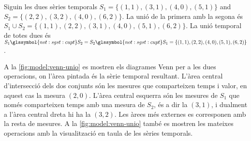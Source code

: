 \begin{example}
  Siguin les dues sèries temporals $S_1=\{(1,1),(3,1),(4,0),(5,1)\}$
  and $S_2=\{(2,2),(3,2),(4,0),(6,2)\}$.  La unió de la primera amb la
  segona és $S_1 \cup S_2 = \{(1,1),(2,2), (3,1),
  (4,0),(5,1),(6,2)\}$. La unió temporal de totes dues és $S_1
  \glssymbol{not:sgst:cupt} S_2 = S_2 \glssymbol{not:sgst:cupt} S_1 =
  \{(1,1),(2,2),(4,0),(5,1),(6,2)\}$. %

  A la \autoref{fig:model:venn-unio} es mostren els diagrames Venn per
  a les dues operacions, on l'àrea pintada és la sèrie temporal
  resultant. L'àrea central d'intersecció dels dos conjunts són les
  mesures que comparteixen temps i valor, en aquest cas la mesura
  $(2,0)$. L'àrea central esquerra són les mesures de $S_1$ que només
  comparteixen temps amb una mesura de $S_2$, és a dir la $(3,1)$, i
  dualment a l'àrea central dreta hi ha la $(3,2)$. Les àrees més
  externes es corresponen amb la resta de mesures.  A la
  \autoref{fig:model:venn-unio} també es mostren les mateixes
  operacions amb la visualització en taula de les sèries temporals.

  \begin{figure}
    \centering 
    


\end{figure}
\end{example}
